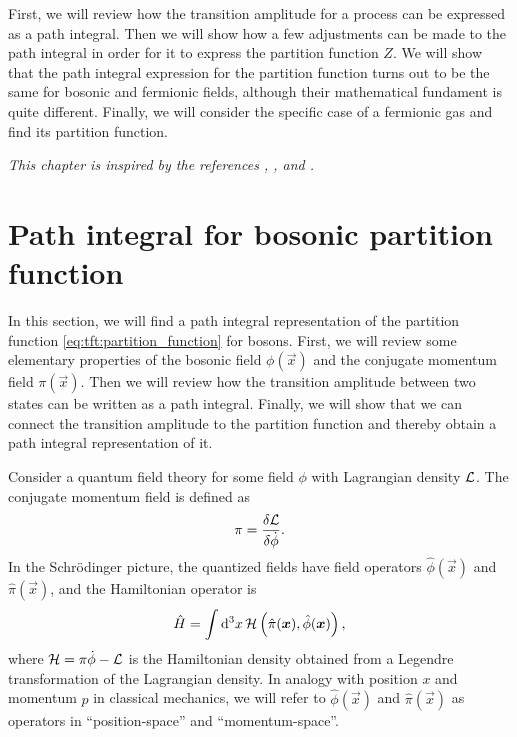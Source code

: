 First, we will review how the transition amplitude for a process can be expressed as a path integral.
Then we will show how a few adjustments can be made to the path integral in order for it to express the partition function $Z$.
We will show that the path integral expression for the partition function turns out to be the same for bosonic and fermionic fields, although their mathematical fundament is quite different.
Finally, we will consider the specific case of a fermionic gas and find its partition function.

\textit{This chapter is inspired by the references \cite{ref:kapusta}, \cite{ref:altland_simons}, \cite{ref:tft_basics} and \cite{ref:tft_random_note_1}.}

\section{Path integral for bosonic partition function}
\label{sec:tft:path_integral_boson}


In this section, we will find a path integral representation of the partition function \eqref{eq:tft:partition_function} for bosons.
First, we will review some elementary properties of the bosonic field $\phi(\vec{x})$ and the conjugate momentum field $\pi(\vec{x})$.
Then we will review how the transition amplitude between two states can be written as a path integral.
Finally, we will show that we can connect the transition amplitude to the partition function and thereby obtain a path integral representation of it.

Consider a quantum field theory for some field $\phi$ with Lagrangian density $\mathcal{L}$.
The conjugate momentum field is defined as
\begin{equation}
	\pi = \fdv{\lagr}{\dot\phi} .
\label{eq:tft:conjugate_mometum_definition}
\end{equation}
In the Schrödinger picture, the quantized fields have field operators $\hat{\phi}(\vec{x})$ and $\hat{\pi}(\vec{x})$, and the Hamiltonian operator is
\begin{equation}
	\hat{H} = \int \mathop{}\!\mathrm{d}^3 x \, \mathcal{H} \left( \hat{\pi}({\bm{x}}), \hat{\phi}({\bm{x}}) \right) ,
\end{equation}
where $\mathcal{H} = \pi \dot\phi - \mathcal{L}$ is the Hamiltonian density obtained from a Legendre transformation of the Lagrangian density.
In analogy with position $x$ and momentum $p$ in classical mechanics, we will refer to $\hat\phi(\vec{x})$ and $\hat\pi(\vec{x})$ as operators in ``position-space'' and ``momentum-space''.

